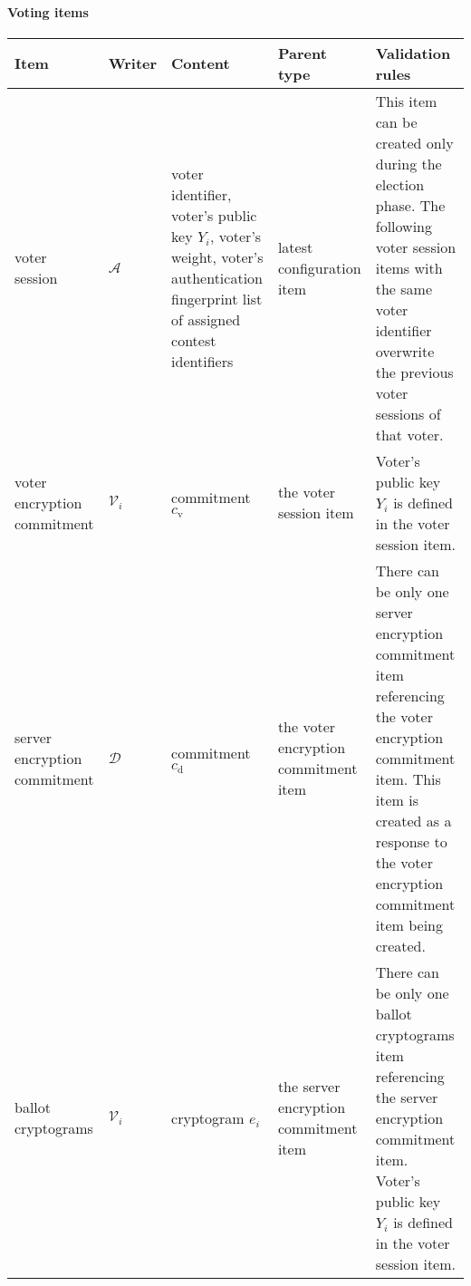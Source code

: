 \begin{landscape}
\clearpage
\paragraph{Voting items}
\begin{longtable}{|
    >{\raggedright}p{} |
    >{\centering}p{} |
    >{\raggedright}p{} |
    >{\raggedright}p{} |
    p{} |
} 
    \hline
    \textbf{Item} &
    \textbf{Writer} &
    \textbf{Content} &
    \textbf{Parent type} &
    \textbf{Validation rules} \\
    \hline
    \endhead

    voter session &
    $\mathcal{A}$ &
    voter identifier, \newline voter's public key $Y_i$, \newline voter's weight, \newline voter's authentication fingerprint \newline list of assigned contest identifiers &
    latest configuration item &
    This item can be created only during the election phase. \newline The following voter session items with the same voter identifier overwrite the previous voter sessions of that voter.
    \\ \hline

    voter encryption commitment &
    $\mathcal{V}_i$ &
    commitment $c_\mathrm{v}$ &
    the voter session item &
    Voter's public key $Y_i$ is defined in the voter session item.
    \\ \hline

    server encryption commitment &
    $\mathcal{D}$ &
    commitment $c_\mathrm{d}$ &
    the voter encryption commitment item &
    There can be only one server encryption commitment item referencing the voter encryption commitment item. \newline This item is created as a response to the voter encryption commitment item being created.
    \\ \hline

    ballot cryptograms &
    $\mathcal{V}_i$ &
    cryptogram $e_i$ &
    the server encryption commitment item &
    There can be only one ballot cryptograms item referencing the server encryption commitment item. \newline Voter's public key $Y_i$ is defined in the voter session item.
    \\ \hline


\end{longtable}
\end{landscape}
